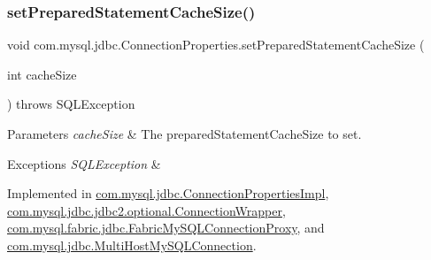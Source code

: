 \subsubsection{\texorpdfstring{set\+Prepared\+Statement\+Cache\+Size()}{setPreparedStatementCacheSize()}}
{\footnotesize\ttfamily void com.\+mysql.\+jdbc.\+Connection\+Properties.\+set\+Prepared\+Statement\+Cache\+Size (\begin{DoxyParamCaption}\item[{int}]{cache\+Size }\end{DoxyParamCaption}) throws S\+Q\+L\+Exception}


\begin{DoxyParams}{Parameters}
{\em cache\+Size} & The prepared\+Statement\+Cache\+Size to set. \\
\hline
\end{DoxyParams}

\begin{DoxyExceptions}{Exceptions}
{\em S\+Q\+L\+Exception} & \\
\hline
\end{DoxyExceptions}


Implemented in \mbox{\hyperlink{classcom_1_1mysql_1_1jdbc_1_1_connection_properties_impl_a170c65de1584d4588ea15ca73e1812bd}{com.\+mysql.\+jdbc.\+Connection\+Properties\+Impl}}, \mbox{\hyperlink{classcom_1_1mysql_1_1jdbc_1_1jdbc2_1_1optional_1_1_connection_wrapper_a5f678b0f5276621832a23fc1c9a31786}{com.\+mysql.\+jdbc.\+jdbc2.\+optional.\+Connection\+Wrapper}}, \mbox{\hyperlink{classcom_1_1mysql_1_1fabric_1_1jdbc_1_1_fabric_my_s_q_l_connection_proxy_ae63a2ce48e207da474e6dbca3d1e65b3}{com.\+mysql.\+fabric.\+jdbc.\+Fabric\+My\+S\+Q\+L\+Connection\+Proxy}}, and \mbox{\hyperlink{classcom_1_1mysql_1_1jdbc_1_1_multi_host_my_s_q_l_connection_a05873fd9b3404787c16dd6ae3793d84e}{com.\+mysql.\+jdbc.\+Multi\+Host\+My\+S\+Q\+L\+Connection}}.

